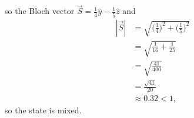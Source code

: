 \documentclass[10pt]{article}
\begin{document}
so the Bloch vector $\vec{S} = \frac{1}{4} \hat{y} - \frac{1}{5} \hat{z}$ and
\begin{align*}
|\vec{S}| &= \sqrt{\Bigg( \frac{1}{4} \Bigg)^2 + \Bigg( \frac{1}{5} \Bigg)^2} \\
              &= \sqrt{\frac{1}{16} + \frac{1}{25}} \\
              &= \sqrt{\frac{41}{400}} \\
              &= \frac{\sqrt{41}}{20} \\
              &\approx 0.32 < 1,
\end{align*}
so the state is mixed.
\end{document}
